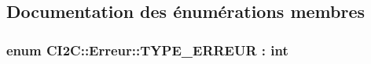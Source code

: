 \subsection{Documentation des énumérations membres}
\hypertarget{class_c_i2_c_1_1_erreur_a153281c8e751b72b355d52c548b511d5}{
\subsubsection[{T\+Y\+P\+E\+\_\+\+E\+R\+R\+E\+U\+R}]{\setlength{\rightskip}{0pt plus 5cm}enum {\bf C\+I2\+C\+::\+Erreur\+::\+T\+Y\+P\+E\+\_\+\+E\+R\+R\+E\+U\+R} \+: int\hspace{0.3cm}{\ttfamily [strong]}}}\label{class_c_i2_c_1_1_erreur_a153281c8e751b72b355d52c548b511d5}
